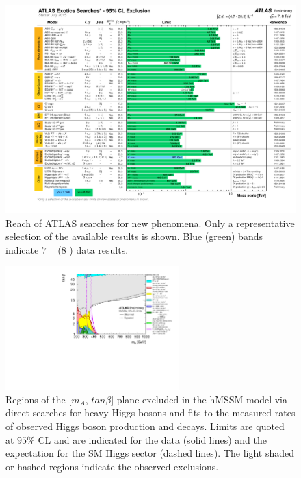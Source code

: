 \begin{figure}[htb!]
  \centering
  \hspace{-2cm}
  \includegraphics[width=\textwidth]{figures/theory/ATLAS_Exotics_Summary_201507}
  \caption{Reach of ATLAS searches for new phenomena. Only a representative selection of the available results is shown. Blue (green) bands indicate $7$ \TeV~ ($8$ \TeV) data results.}
  \label{fig:run1-RSG}
\end{figure}

\begin{figure}[htb!]
  \centering
  \includegraphics[width=0.6\textwidth, angle=-90]{figures/theory/ATLAS_HIGGS5101_BSM_hMSSM_tanb_vs_mA_Summary_LargeRange}
  \caption{Regions of the [$m_A$, $tan\beta$] plane excluded in the hMSSM model via direct searches for heavy Higgs bosons and fits to the measured rates of observed Higgs boson production and decays. Limits are quoted at $95\%$ CL and are indicated for the data (solid lines) and the expectation for the SM Higgs sector (dashed lines). The light shaded or hashed regions indicate the observed exclusions.}
  \label{fig:run1-2HDM}
\end{figure}

